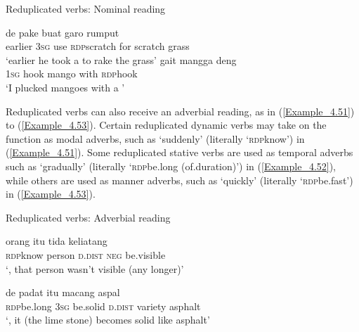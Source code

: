 \begin{styleExampleTitle}
Reduplicated verbs: Nominal reading
\end{styleExampleTitle}
\ea
\label{Example_4.49}
 {de} {pake} {} {buat} {garo} {rumput}\\ %
 earlier  \textsc{3sg}  use  \textsc{rdp}{\Tilde}scratch  for  scratch  grass\\
\glt 
‘earlier he took a  to rake the grass’ \textstyleExampleSource{[Elicited BR120813.010]}
\z
\ea
\label{Example_4.50}
\label{bkm:Ref359941330}
 {gait} {mangga} {deng} {}\\ %
 \textsc{1sg}  hook  mango  with  \textsc{rdp}{\Tilde}hook\\
\glt 
‘I plucked mangoes with a ’ \textstyleExampleSource{[Elicited BR120813.033]}
\z


Reduplicated verbs can also receive an adverbial reading, as in (\ref{Example_4.51}) to (\ref{Example_4.53}). Certain reduplicated dynamic verbs may take on the function as modal adverbs, such as  ‘suddenly’ (literally ‘\textsc{rdp}{\Tilde}know’) in (\ref{Example_4.51}). Some reduplicated stative verbs are used as temporal adverbs such as  ‘gradually’ (literally ‘\textsc{rdp}{\Tilde}be.long (of.duration)’) in (\ref{Example_4.52}), while others are used as manner adverbs, such as  ‘quickly’ (literally ‘\textsc{rdp}{\Tilde}be.fast’) in (\ref{Example_4.53}).


\begin{styleExampleTitle}
Reduplicated verbs: Adverbial reading
\end{styleExampleTitle}

\ea
\label{Example_4.51}
 {orang} {itu} {tida} {keliatang}\\ %
 \textsc{rdp}{\Tilde}know  person  \textsc{d.dist}  \textsc{neg}  be.visible\\
\glt 
‘, that person wasn’t visible (any longer)’ \textstyleExampleSource{[080922-002-Cv.0123]}
\z

\ea
\label{Example_4.52}
 {de} {padat} {itu} {macang} {aspal}\\ %
 \textsc{rdp}{\Tilde}be.long  \textsc{3sg}  be.solid  \textsc{d.dist}  variety  asphalt\\
\glt 
‘, it (the lime stone) becomes solid like asphalt’ \textstyleExampleSource{[081011-001-Cv.0304]}
\z


